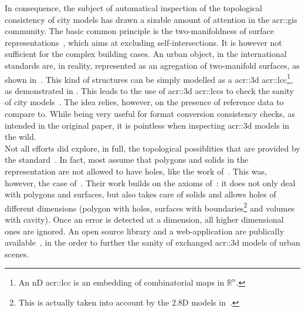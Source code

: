         In consequence, the subject of automatical inspection of the topological consistency of city models has drawn a sizable amount of attention in the \gls{acr::gis} community.
        The basic common principle is the two-manifoldness of surface representations~\parencite{groger2011achieve}, which aims at excluding self-intersections.
        It is however not sufficient for the complex building cases.
        An urban object, in the international standards are, in reality, represented as an agregation of two-manifold surfaces, as shown in~\textcite{groger2011achieve, ledoux2013validation}.
        This kind of structures can be simply modelled as a \gls{acr::3d} \gls{acr::lcc}\parencite{damiand2014combinatorial}\footnote{
            An nD \gls{acr::lcc} is an embedding of combinatorial maps in \(\mathbb{R}^n\).
        }, as demonstrated in \textcite{diakite2014topological}.
        This leads to the use of \gls{acr::3d} \glspl{acr::lcc} to check the sanity of city models~\parencite{gorszczyk2016automatic}.
        The idea relies, however, on the presence of reference data to compare to.
        While being very useful for format conversion consistency checks, as intended in the original paper, it is pointless when inspecting \gls{acr::3d} models in the wild.\\
        Not all efforts did explore, in full, the topological possiblities that are provided by the standard~\parencite{biljecki2016most, ledoux2013validation}.
        In fact, most assume that polygons and solids in the representation are not allowed to have holes, like the work of~\textcite{groger2011achieve, alam2014towards}.
        This was, however, the case of~\textcite{ledoux2013validation}.
        Their work builds on the axioms of~\textcite{groger2011achieve}: it does not only deal with polygons and surfaces, but also takes care of solids and allows holes of different dimensions (polygon with holes, surfaces with boundaries\footnote{
            This is actually taken into account by the 2.8D models in~\textcite{groger2011achieve}.
        } and volumes with cavity).
        Once an error is detected at a dimension, all higher dimensional ones are ignored.
        An open source library and a web-application are publically available~\parencite{ledoux2018val3dity}, in the order to further the sanity of exchanged \gls{acr::3d} models of urban scenes.\\

